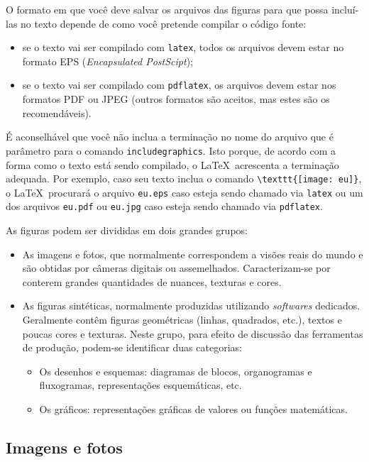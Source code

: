 O formato em que você deve salvar os arquivos das figuras para que
possa incluí-las no texto depende de como você pretende compilar
o código fonte:
\begin{itemize}
\item se o texto vai ser compilado com \texttt{latex}, todos os
arquivos devem estar no formato EPS (\emph{Encapsulated PostScipt});
\item se o texto vai ser compilado com \texttt{pdflatex}, os
arquivos devem estar nos formatos PDF ou JPEG (outros formatos são
aceitos, mas estes são os recomendáveis).
\end{itemize}
É aconselhável que você não inclua a terminação no nome do arquivo que
é parâmetro para o comando \texttt{includegraphics}. Isto porque, de
acordo com a forma como o texto está sendo compilado, o \LaTeX\
acrescenta a terminação adequada. Por exemplo, caso seu texto inclua o
comando \verb|\texttt{[image: eu]}|, o \LaTeX\ procurará o arquivo
\texttt{eu.eps} caso esteja sendo chamado via \texttt{latex} ou um dos
arquivos \texttt{eu.pdf} ou \texttt{eu.jpg} caso esteja sendo chamado
via \texttt{pdflatex}.

As figuras podem ser divididas em dois grandes grupos:
\begin{itemize}
\item As imagens e fotos, que normalmente correspondem a visões reais
do mundo e são obtidas por câmeras digitais ou
assemelhados. Caracterizam-se por conterem grandes quantidades de
nuances, texturas e cores.
\item As figuras sintéticas, normalmente produzidas utilizando
\emph{softwares} dedicados. Geralmente contêm figuras geométricas
(linhas, quadrados, etc.), textos e poucas cores e texturas. Neste
grupo, para efeito de discussão das ferramentas de produção, podem-se
identificar duas categorias:
\begin{itemize}
\item Os desenhos e esquemas: diagramas de blocos, organogramas e
fluxogramas, representações esquemáticas, etc.
\item Os gráficos: representações gráficas de valores ou funções
matemáticas.
\end{itemize}
\end{itemize}

\subsection{Imagens e fotos}
\label{Sec:imagens}


